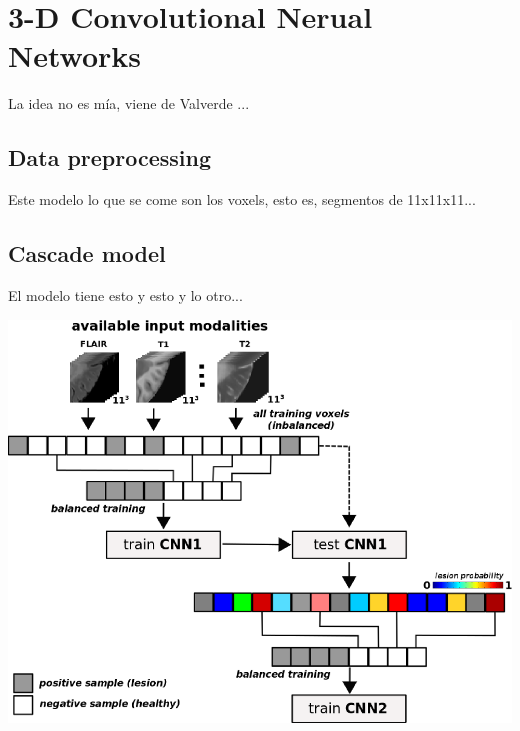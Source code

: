 \chapter{3-D Convolutional Nerual Networks}
\label{4.3D_CNN}

La idea no es mía, viene de Valverde \cite{VALVERDE:2017}...

\section{Data preprocessing}
Este modelo lo que se come son los voxels, esto es, segmentos de 11x11x11...

\newpage
\section{Cascade model}
El modelo tiene esto y esto y lo otro...

\begin{center}
\includegraphics[width=\textwidth]{images/cascade_model.png}
\end{center}